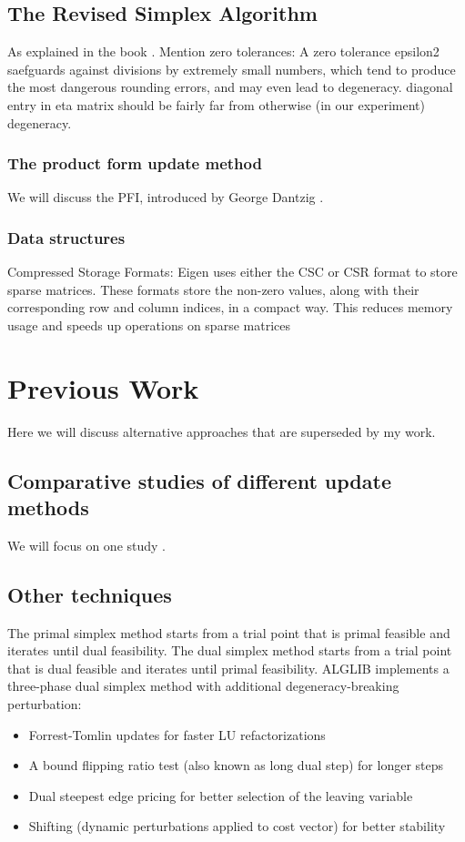 \subsection{The Revised Simplex Algorithm}
As explained in the book \parencite{chvatal1983linear}. 
Mention zero tolerances: A zero tolerance epsilon2 saefguards against divisions
by extremely small numbers, which tend to produce the most dangerous rounding errors, and 
may even lead to degeneracy. diagonal entry in eta matrix should be fairly far from
 otherwise (in our experiment) degeneracy.
\subsubsection*{The product form update method}
We will discuss the PFI, introduced by George Dantzig \parencite{dantzig1954product}.
\subsubsection*{Data structures}
Compressed Storage Formats:
Eigen uses either the CSC or CSR format to store sparse matrices. These formats store the non-zero values, along with their corresponding row and column indices, 
in a compact way. This reduces memory usage and speeds up operations on sparse matrices
\section{Previous Work}
Here we will discuss alternative approaches that are superseded by my work.
\subsection{Comparative studies of different update methods}
We will focus on one study \parencite{huangfu2015novel}.
\subsection{Other techniques}
The primal simplex method starts from a trial point that is primal feasible and iterates until dual feasibility.
The dual simplex method starts from a trial point that is dual feasible and iterates until primal feasibility.
ALGLIB implements a three-phase dual simplex method with additional degeneracy-breaking perturbation:
\begin{itemize}
    \item Forrest-Tomlin updates for faster LU refactorizations
    \item A bound flipping ratio test (also known as long dual step) for longer steps
    \item Dual steepest edge pricing for better selection of the leaving variable
    \item Shifting (dynamic perturbations applied to cost vector) for better stability
\end{itemize}
